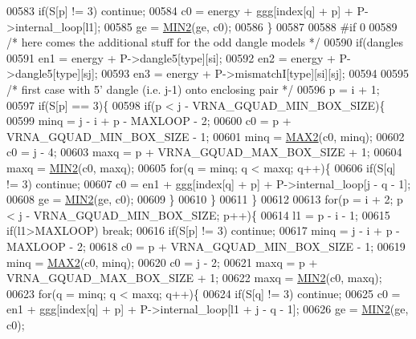 \begin{DoxyCode}
00583       \textcolor{keywordflow}{if}(S[p] != 3) \textcolor{keywordflow}{continue};
00584       c0  = energy + ggg[index[q] + p] + P->internal\_loop[l1];
00585       ge  = \hyperlink{group__utils_ga2dd4a927a7f937f43a90c144d79107d8}{MIN2}(ge, c0);
00586     \}
00587 
00588 \textcolor{preprocessor}{#if 0}
00589   \textcolor{comment}{/* here comes the additional stuff for the odd dangle models */}
00590   \textcolor{keywordflow}{if}(dangles %
00591     en1 = energy + P->dangle5[type][si];
00592     en2 = energy + P->dangle5[type][sj];
00593     en3 = energy + P->mismatchI[type][si][sj];
00594 
00595     \textcolor{comment}{/* first case with 5' dangle (i.e. j-1) onto enclosing pair */}
00596     p = i + 1;
00597     \textcolor{keywordflow}{if}(S[p] == 3)\{
00598       \textcolor{keywordflow}{if}(p < j - VRNA\_GQUAD\_MIN\_BOX\_SIZE)\{
00599         minq  = j - i + p - MAXLOOP - 2;
00600         c0    = p + VRNA\_GQUAD\_MIN\_BOX\_SIZE - 1;
00601         minq  = \hyperlink{group__utils_gadd91367918fadbc8d585940d6206d6d2}{MAX2}(c0, minq);
00602         c0    = j - 4;
00603         maxq  = p + VRNA\_GQUAD\_MAX\_BOX\_SIZE + 1;
00604         maxq  = \hyperlink{group__utils_ga2dd4a927a7f937f43a90c144d79107d8}{MIN2}(c0, maxq);
00605         \textcolor{keywordflow}{for}(q = minq; q < maxq; q++)\{
00606           \textcolor{keywordflow}{if}(S[q] != 3) \textcolor{keywordflow}{continue};
00607           c0  = en1 + ggg[index[q] + p] + P->internal\_loop[j - q - 1];
00608           ge  = \hyperlink{group__utils_ga2dd4a927a7f937f43a90c144d79107d8}{MIN2}(ge, c0);
00609         \}
00610       \}
00611     \}
00612 
00613     \textcolor{keywordflow}{for}(p = i + 2; p < j - VRNA\_GQUAD\_MIN\_BOX\_SIZE; p++)\{
00614       l1    = p - i - 1;
00615       \textcolor{keywordflow}{if}(l1>MAXLOOP) \textcolor{keywordflow}{break};
00616       \textcolor{keywordflow}{if}(S[p] != 3) \textcolor{keywordflow}{continue};
00617       minq  = j - i + p - MAXLOOP - 2;
00618       c0    = p + VRNA\_GQUAD\_MIN\_BOX\_SIZE - 1;
00619       minq  = \hyperlink{group__utils_gadd91367918fadbc8d585940d6206d6d2}{MAX2}(c0, minq);
00620       c0    = j - 2;
00621       maxq  = p + VRNA\_GQUAD\_MAX\_BOX\_SIZE + 1;
00622       maxq  = \hyperlink{group__utils_ga2dd4a927a7f937f43a90c144d79107d8}{MIN2}(c0, maxq);
00623       \textcolor{keywordflow}{for}(q = minq; q < maxq; q++)\{
00624         \textcolor{keywordflow}{if}(S[q] != 3) \textcolor{keywordflow}{continue};
00625         c0  = en1 + ggg[index[q] + p] + P->internal\_loop[l1 + j - q - 1];
00626         ge   = \hyperlink{group__utils_ga2dd4a927a7f937f43a90c144d79107d8}{MIN2}(ge, c0);

\end{DoxyCode}
